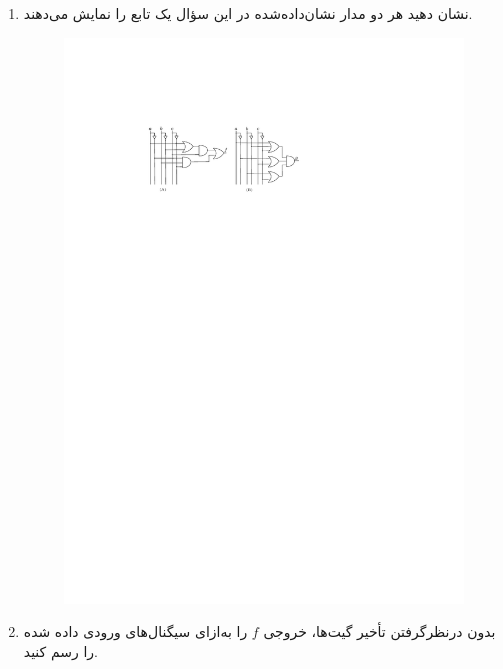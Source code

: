 \begin{enumerate}
	\item 
	نشان دهید هر دو مدار نشان‌داده‌شده در این سؤال یک تابع را نمایش می‌دهند. 
	
	\begin{figure}[h]
		\centering
		\includegraphics[width=1\textwidth]{fig/Q3.pdf}
		\label{fig:Q6_a}
	\end{figure}
	
	\item 
	بدون درنظرگرفتن تأخیر گیت‌ها، خروجی $f$ را به‌ازای سیگنال‌های ورودی داده شده را رسم کنید.
	

\end{enumerate}
